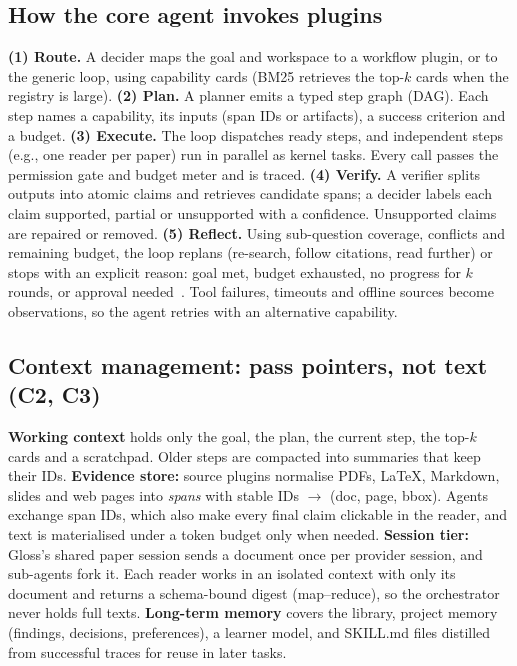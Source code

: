 \documentclass{article}
\newcommand{\gloss}{Gloss}
\begin{document}
\subsection{How the core agent invokes plugins}
\textbf{(1) Route.} A decider maps the goal and workspace to a workflow plugin, or to the generic loop, using capability cards (BM25 retrieves the top-$k$ cards when the registry is large).
\textbf{(2) Plan.} A planner emits a typed step graph (DAG). Each step names a capability, its inputs (span IDs or artifacts), a success criterion and a budget.
\textbf{(3) Execute.} The loop dispatches ready steps, and independent steps (e.g., one reader per paper) run in parallel as kernel tasks. Every call passes the permission gate and budget meter and is traced.
\textbf{(4) Verify.} A verifier splits outputs into atomic claims and retrieves candidate spans; a decider labels each claim supported, partial or unsupported with a confidence. Unsupported claims are repaired or removed.
\textbf{(5) Reflect.} Using sub-question coverage, conflicts and remaining budget, the loop replans (re-search, follow citations, read further) or stops with an explicit reason: goal met, budget exhausted, no progress for $k$ rounds, or approval needed~\cite{shinn2023reflexion}. Tool failures, timeouts and offline sources become observations, so the agent retries with an alternative capability.

\subsection{Context management: pass pointers, not text (C2, C3)}
\textbf{Working context} holds only the goal, the plan, the current step, the top-$k$ cards and a scratchpad. Older steps are compacted into summaries that keep their IDs.
\textbf{Evidence store:} source plugins normalise PDFs, \LaTeX{}, Markdown, slides and web pages into \emph{spans} with stable IDs $\to$ (doc, page, bbox). Agents exchange span IDs, which also make every final claim clickable in the reader, and text is materialised under a token budget only when needed.
\textbf{Session tier:} \gloss{}'s shared paper session sends a document once per provider session, and sub-agents fork it. Each reader works in an isolated context with only its document and returns a schema-bound digest (map--reduce), so the orchestrator never holds full texts.
\textbf{Long-term memory} covers the library, project memory (findings, decisions, preferences), a learner model, and SKILL.md files distilled from successful traces for reuse in later tasks.
\end{document}

